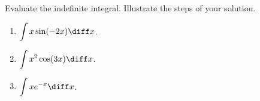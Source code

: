 Evaluate the indefinite integral. Illustrate the steps of your solution.
\begin{enumerate}
\item $\displaystyle \int x\sin (-2x)\diff x$.
\item $\displaystyle \int x^2\cos (3x)\diff x$.
\item $\displaystyle \int x e^{-x}\diff x$.
\end{enumerate}
